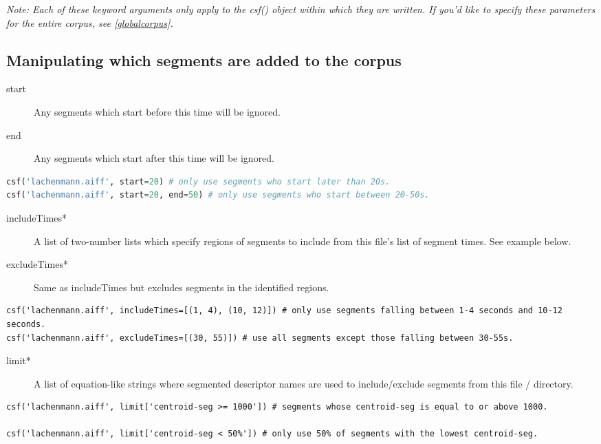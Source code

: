 \documentclass{article}
\begin{document}
\begin{spacing}{1.2}
\emph{Note: Each of these keyword arguments \emph{only} apply to the csf() object within which they are written.  If you'd like to specify these parameters for the entire corpus, see \ref{globalcorpus}.}

\subsection{Manipulating which segments are added to the corpus}
\begin{description}
\item[start] Any segments which start before this time will be ignored.
\item[end] Any segments which start after this time will be ignored.
\end{description}

\begin{lstlisting}[language=python]
csf('lachenmann.aiff', start=20) # only use segments who start later than 20s.
csf('lachenmann.aiff', start=20, end=50) # only use segments who start between 20-50s.
\end{lstlisting}

\begin{description}
\item[includeTimes*] A list of two-number lists which specify regions of segments to include from this file's list of segment times.  See example below.
\item[excludeTimes*] Same as includeTimes but excludes segments in the identified regions.
\end{description}

\begin{lstlisting}
csf('lachenmann.aiff', includeTimes=[(1, 4), (10, 12)]) # only use segments falling between 1-4 seconds and 10-12 seconds.
csf('lachenmann.aiff', excludeTimes=[(30, 55)]) # use all segments except those falling between 30-55s.
\end{lstlisting}

\begin{description}
\item[limit*] A list of equation-like strings where segmented descriptor names are used to include/exclude segments from this file / directory.
\end{description}
\begin{lstlisting}
csf('lachenmann.aiff', limit['centroid-seg >= 1000']) # segments whose centroid-seg is equal to or above 1000.

csf('lachenmann.aiff', limit['centroid-seg < 50%']) # only use 50% of segments with the lowest centroid-seg.


\end{lstlisting}
\end{spacing}
\end{document}
